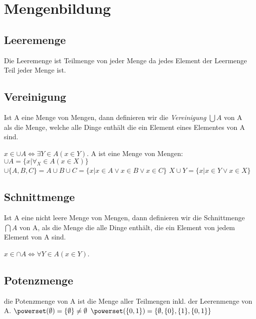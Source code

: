 \section{Mengenbildung}
\subsection{Leeremenge}
Die Leeremenge ist Teilmenge von jeder Menge da jedes Element der Leermenge Teil jeder Menge ist.
\subsection{Vereinigung}
Ist A eine Menge von Mengen, dann definieren wir die \emph{Vereinigung} \( \bigcup A\) von A als die Menge, welche alle Dinge enthält die ein Element eines Elementes von A sind.
\par \hspace*{10mm} \( x \in \cup A \Leftrightarrow \exists Y \in A(x \in Y) \).
\newline A ist eine Menge von Mengen: \newline
\hspace*{10mm}\( \cup A = \{x | \forall_X \in A (x \in X)\}\) \newline
\hspace*{10mm}\( \cup \{A, B, C\} = A \cup B \cup C = \{x|x \in A \vee x \in B \vee x \in C\}\) \newline
\hspace*{10mm}\( X \cup Y = \{ x | x \in Y \vee x \in X \}\)
\subsection{Schnittmenge}
Ist A eine nicht leere Menge von Mengen, dann definieren wir die Schnittmenge \(\bigcap A\) von A, als die Menge die alle Dinge enthält, die ein Element von jedem Element von A sind.
\par \hspace*{10mm} \( x \in \cap A \Leftrightarrow \forall Y \in A(x \in Y) \).
\subsection{Potenzmenge}
die Potenzmenge von A ist die Menge aller Teilmengen inkl. der Leerenmenge von A. \newline
\( \powerset(\emptyset) = \{\emptyset\} \neq \emptyset \) \newline
\( \powerset(\{0, 1\}) = \{\emptyset, \{0\}, \{1\}, \{0,1\}\} \)
